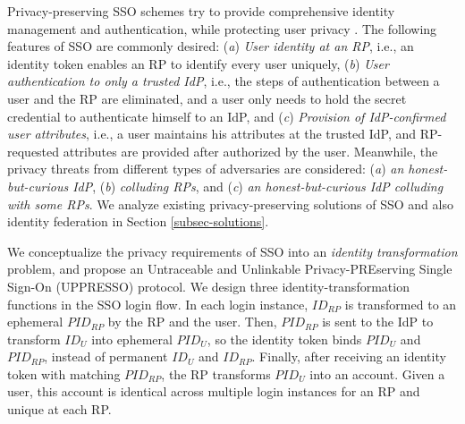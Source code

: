 Privacy-preserving SSO schemes try to provide comprehensive identity management and authentication,
    while protecting user privacy \cite{maler2008venn,NIST2017draft,BrowserID,SPRESSO}.
The following features of SSO are commonly desired:
(\emph{a}) \emph{User identity at an RP},
    i.e., an identity token enables an RP to identify every user uniquely,
(\emph{b}) \emph{User authentication to only a trusted IdP}, i.e.,
    the steps of authentication between a user and the RP are eliminated,
    and a user only needs to hold the secret credential to authenticate himself to an IdP,
and (\emph{c}) \emph{Provision of IdP-confirmed user attributes},
    i.e., a user maintains his attributes at the trusted IdP,
    and RP-requested attributes are provided %
            after authorized by the user.
Meanwhile,
    the privacy threats from different types of adversaries are considered:
    (\emph{a}) \emph{an honest-but-curious IdP},
    (\emph{b}) \emph{colluding RPs},
    and (\emph{c}) \emph{an honest-but-curious IdP colluding with some RPs}.
We analyze existing privacy-preserving solutions of SSO and also identity federation
in Section \ref{subsec-solutions}.



We conceptualize the privacy requirements of SSO into
  an {\em identity transformation} problem, %
and propose an Untraceable and Unlinkable Privacy-PREserving Single Sign-On (UPPRESSO) protocol.
We design three identity-transformation functions in the SSO login flow.
In each login instance,
        $ID_{RP}$ is transformed to an ephemeral $PID_{RP}$  by the RP and the user.
Then, $PID_{RP}$ is sent to the IdP to transform $ID_U$ into ephemeral $PID_U$,
    so the identity token binds $PID_U$ and $PID_{RP}$, instead of permanent $ID_U$ and $ID_{RP}$.
Finally,
    after receiving an identity token with matching $PID_{RP}$,
        the RP transforms $PID_U$ into an account.
Given a user, this account is identical across multiple login instances for an RP
     and unique at each RP.


